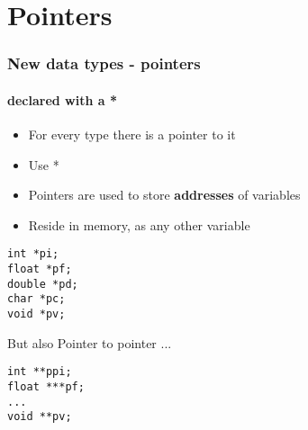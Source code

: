 \documentclass[10pt]{beamer}
\begin{document}
\section{Pointers}

\begin{frame}[fragile]
  \frametitle{New data types - pointers}
  \framesubtitle{declared with a *}
  \begin{itemize}
    \item For every type there is a pointer to it
    \item Use *
    \item Pointers are used to store \textbf{addresses} of variables
    \item Reside in memory, as any other variable
  \end{itemize}
  
\begin{lstlisting}
int *pi;
float *pf;
double *pd;
char *pc;
void *pv;
\end{lstlisting}
But also Pointer to pointer ...
\begin{lstlisting}
int **ppi;
float ***pf;
...
void **pv;
\end{lstlisting}
\end{frame}
\end{document}

